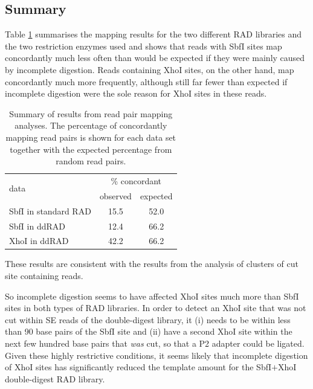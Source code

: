 \documentclass[a4paper,12pt,times,print,index,custombib,custommargin]{PhDThesisPSnPDF}\usepackage[]{graphicx}\usepackage[]{color}
\begin{document}
\subsection{Summary}

Table \ref{tab:mapping_summary} summarises the mapping results for the two different RAD libraries and the two restriction enzymes used and shows that reads with SbfI sites map concordantly much less often than would be expected if they were mainly caused by incomplete digestion. Reads containing XhoI sites, on the other hand, map concordantly much more frequently, although still far fewer than expected if incomplete digestion were the sole reason for XhoI sites in these reads.
%
\begin{table}
\centering
\caption{\small Summary of results from read pair mapping analyses. The percentage of concordantly mapping read pairs is shown for each data set together with the expected percentage from random read pairs.}
\label{tab:mapping_summary}
\vspace{5pt}
\begin{tabular}{lcc}
\toprule
\multirow{2}{*}{data} & \multicolumn{2}{c}{\% concordant} \\
                                    & observed & expected \\
\midrule
SbfI in standard RAD & 15.5 & 52.0  \\
SbfI in ddRAD & 12.4 & 66.2 \\
XhoI in ddRAD & 42.2 & 66.2 \\
\bottomrule
\end{tabular}
\end{table}
%
These results are consistent with the results from the analysis of clusters of cut site containing reads. 

So incomplete digestion seems to have affected XhoI sites much more than SbfI sites in both types of RAD libraries. 
In order to detect an XhoI site that was not cut within SE reads of the double-digest library, it (i) needs to be within less than 90 base pairs of the SbfI site and (ii) have a second XhoI site within the next few hundred base pairs that \emph{was} cut, so that a P2 adapter could be ligated. Given these highly restrictive conditions, it seems likely that incomplete digestion of XhoI sites has significantly reduced the template amount for the SbfI$+$XhoI double-digest RAD library.
\end{document}
